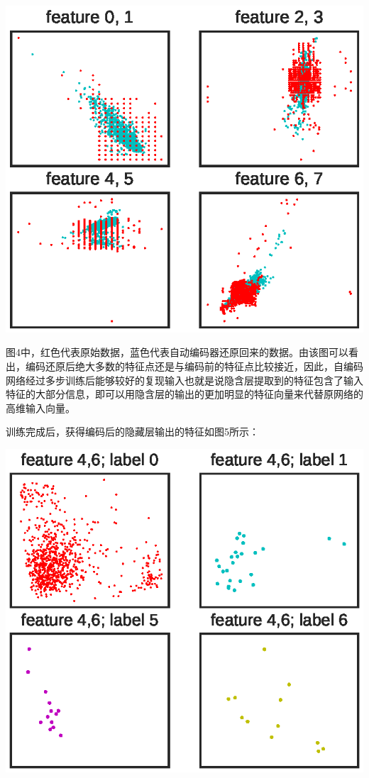 \documentclass{ctacn}%
\begin{document}
\begin{multicols}{2}
\begin{center}
	\includegraphics[scale=0.7, trim=0 0 0 0]{figs/autoencoder_restore}\\
	\label{fig5}
\end{center}

图4中，红色代表原始数据，蓝色代表自动编码器还原回来的数据。由该图可以看出，编码还原后绝大多数的特征点还是与编码前的特征点比较接近，因此，自编码网络经过多步训练后能够较好的复现输入也就是说隐含层提取到的特征包含了输入特征的大部分信息，即可以用隐含层的输出的更加明显的特征向量来代替原网络的高维输入向量。

训练完成后，获得编码后的隐藏层输出的特征如图5所示：

\begin{center}
	\includegraphics[scale=0.7, trim=0 0 0 0]{figs/autoencoder_encoded_features}\\
	\label{fig6}
\end{center}


\end{multicols}
\end{document}
